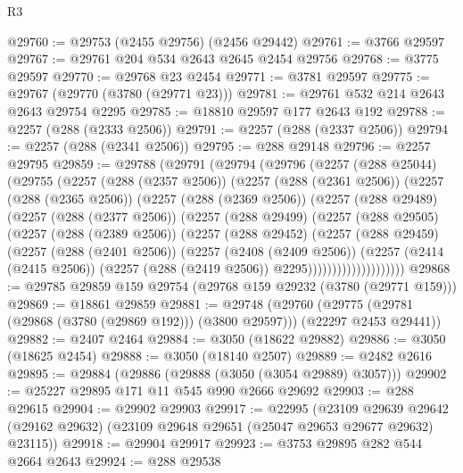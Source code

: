 \begin{lexlean}{R3}
\begin{coremodule}
@29760 := @29753 (@2455 @29756) (@2456 @29442)
@29761 := @3766 @29597
@29767 := @29761 @204 @534 @2643 @2645 @2454 @29756
@29768 := @3775 @29597
@29770 := @29768 @23 @2454
@29771 := @3781 @29597
@29775 := @29767 (@29770 (@3780 (@29771 @23)))
@29781 := @29761 @532 @214 @2643 @2643 @29754 @2295
@29785 := @18810 @29597 @177 @2643 @192
@29788 := @2257 (@288 (@2333 @2506))
@29791 := @2257 (@288 (@2337 @2506))
@29794 := @2257 (@288 (@2341 @2506))
@29795 := @288 @29148
@29796 := @2257 @29795
@29859 := @29788
    (@29791
      (@29794
        (@29796
          (@2257
            (@288 @25044)
            (@29755
              (@2257
                (@288 (@2357 @2506))
                (@2257
                  (@288 (@2361 @2506))
                  (@2257
                    (@288 (@2365 @2506))
                    (@2257
                      (@288 (@2369 @2506))
                      (@2257
                        (@288 @29489)
                        (@2257
                          (@288 (@2377 @2506))
                          (@2257
                            (@288 @29499)
                            (@2257
                              (@288 @29505)
                              (@2257
                                (@288 (@2389 @2506))
                                (@2257
                                  (@288 @29452)
                                  (@2257
                                    (@288 @29459)
                                    (@2257
                                      (@288 (@2401 @2506))
                                      (@2257
                                        (@2408 (@2409 @2506))
                                        (@2257
                                          (@2414 (@2415 @2506))
                                          (@2257 (@288 (@2419 @2506)) @2295))))))))))))))))))))
@29868 := @29785 @29859 @159 @29754 (@29768 @159 @29232 (@3780 (@29771 @159)))
@29869 := @18861 @29859
@29881 := @29748
    (@29760 (@29775 (@29781 (@29868 (@3780 (@29869 @192))) (@3800 @29597))) (@22297 @2453 @29441))
@29882 := @2407 @2464
@29884 := @3050 (@18622 @29882)
@29886 := @3050 (@18625 @2454)
@29888 := @3050 (@18140 @2507)
@29889 := @2482 @2616
@29895 := @29884 (@29886 (@29888 (@3050 (@3054 @29889) @3057)))
@29902 := @25227 @29895 @171 @11 @545 @990 @2666 @29692
@29903 := @288 @29615
@29904 := @29902 @29903
@29917 := @22995
    (@23109
      @29639
      @29642
      (@29162 @29632)
      (@23109 @29648 @29651 (@25047 @29653 @29677 @29632) @23115))
@29918 := @29904 @29917
@29923 := @3753 @29895 @282 @544 @2664 @2643
@29924 := @288 @29538

\end{coremodule}
\end{lexlean}

